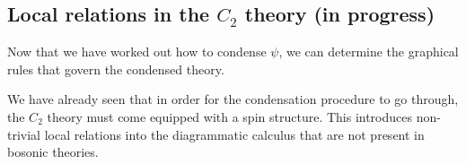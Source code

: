 \documentclass[12pt,a4paper]{article}
\newcommand{\PsiEnd}{\mathord{\vcenter{\hbox{\texttt{[image: PsiEnd.pdf]}}}}}
\newcommand{\PsiEndExchange}{\mathord{\vcenter{\hbox{\texttt{[image: PsiEndExchange.pdf]}}}}}
\begin{document}

 
\subsection{Local relations in the $C_2$ theory (in progress)}
Now that we have worked out how to condense $\psi$, we can determine the graphical rules that govern the condensed theory. 

We have already seen that in order for the condensation procedure to go through, the $C_2$ theory must come equipped with a spin structure. This introduces non-trivial local relations into the diagrammatic calculus that are not present in bosonic theories.  
\end{document}
